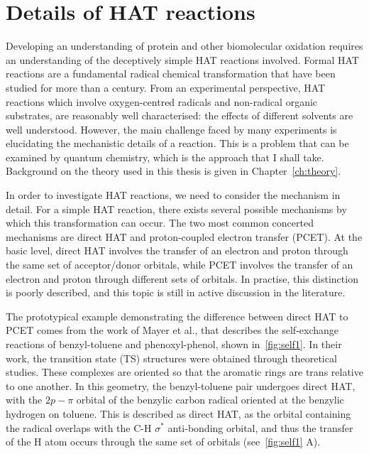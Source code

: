 \section{Details of HAT reactions}

Developing an understanding of protein and other biomolecular oxidation requires an understanding of the deceptively simple HAT reactions involved. Formal HAT reactions are a fundamental radical chemical transformation that have been studied for more than a century.\cite{Kochi1973, Parsons2000} From an experimental perspective, HAT reactions which involve oxygen-centred radicals and non-radical organic substrates, are reasonably well characterised: the effects of different solvents are well understood.\cite{Litwinienko2007} However, the main challenge faced by many experiments is elucidating the mechanistic details of a reaction. This is a problem that can be examined by quantum chemistry, which is the approach that I shall take. Background on the theory used in this thesis is given in Chapter~\ref{ch:theory}.

In order to investigate HAT reactions, we need to consider the mechanism in detail. For a simple HAT reaction, there exists several possible mechanisms by which this transformation can occur. The two most common concerted mechanisms are direct HAT and proton-coupled electron transfer (PCET). At the basic level, direct HAT involves the transfer of an electron and proton through the same set of acceptor/donor orbitals, while PCET involves the transfer of an electron and proton through different sets of orbitals. In practise, this distinction is poorly described, and this topic is still in active discussion in the literature.\cite{Cukier1998, Mayer2002, Stubbe2003, Mayer2004, DiLabio2007, Huynh2007, HammesSchiffer2008, Mayer2010, Weinberg2012, HammesSchiffer2015, MunozRugeles2017}

The prototypical example demonstrating the difference between direct HAT to PCET comes from the work of Mayer et al.,\cite{Mayer2002} that describes the self-exchange reactions of benzyl-toluene and phenoxyl-phenol, shown in~\ref{fig:self1}. In their work, the transition state (TS) structures were obtained through theoretical studies. These complexes are oriented so that the aromatic rings are trans relative to one another. In this geometry, the benzyl-toluene pair undergoes direct HAT, with the $2p-\pi$ orbital of the benzylic carbon radical oriented at the benzylic hydrogen on toluene. This is described as direct HAT, as the orbital containing the radical overlaps with the C-H $\sigma^*$ anti-bonding orbital, and thus the transfer of the H atom occurs through the same set of orbitals (see~\ref{fig:self1} A).

